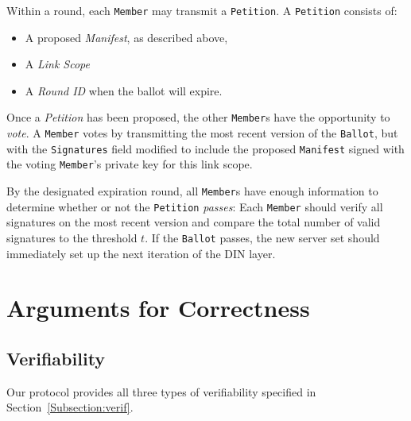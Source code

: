 %
Within a round, each \texttt{Member} may  transmit a \texttt{Petition}. A
\texttt{Petition} consists of:
\begin{itemize}
  \item A proposed \emph{Manifest}, as described above,
  \item A \emph{Link Scope}
  \item A \emph{Round ID} when the ballot will expire.
\end{itemize}

Once a \emph{Petition} has been proposed, the other \texttt{Member}s have the
opportunity to \emph{vote}. A \texttt{Member} votes by transmitting the most
recent version of the \texttt{Ballot}, but with the \texttt{Signatures} field
modified to include the proposed \texttt{Manifest} signed with the voting
\texttt{Member}'s private key for this link scope.

By the designated expiration round, all \texttt{Member}s have enough
information to determine whether or not the \texttt{Petition} \emph{passes}:
Each \texttt{Member} should verify all signatures on the most recent
version
and compare the total number of valid signatures to the threshold $t$. If the
\texttt{Ballot} passes, the new server set should immediately set up the
next iteration of the DIN layer.

\section{Arguments for Correctness}
\subsection{Verifiability}
Our protocol provides all three types of verifiability specified in
Section~\ref{Subsection:verif}.

